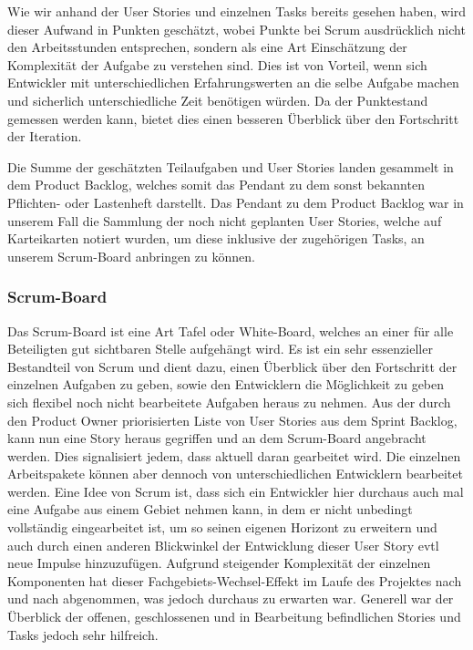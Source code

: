 Wie wir anhand der User Stories und einzelnen Tasks bereits gesehen haben, wird dieser Aufwand in Punkten geschätzt, wobei Punkte bei Scrum ausdrücklich nicht den Arbeitsstunden entsprechen, sondern als eine Art Einschätzung der Komplexität der Aufgabe zu verstehen sind. Dies ist von Vorteil, wenn sich Entwickler mit unterschiedlichen Erfahrungswerten an die selbe Aufgabe machen und sicherlich unterschiedliche Zeit benötigen würden. Da der Punktestand gemessen werden kann, bietet dies einen besseren Überblick über den Fortschritt der Iteration.

Die Summe der geschätzten Teilaufgaben und User Stories landen gesammelt in dem Product Backlog, welches somit das Pendant zu dem sonst bekannten Pflichten- oder Lastenheft darstellt. Das Pendant zu dem Product Backlog war in unserem Fall die Sammlung der noch nicht geplanten User Stories, welche auf Karteikarten notiert wurden, um diese inklusive der zugehörigen Tasks, an unserem Scrum-Board anbringen zu können.


\subsubsection{Scrum-Board}
Das Scrum-Board ist eine Art Tafel oder White-Board, welches an einer für alle Beteiligten gut sichtbaren Stelle aufgehängt wird. Es ist ein sehr essenzieller Bestandteil von Scrum und dient dazu, einen Überblick über den Fortschritt der einzelnen Aufgaben zu geben, sowie den Entwicklern die Möglichkeit zu geben sich flexibel noch nicht bearbeitete Aufgaben heraus zu nehmen.
Aus der durch den Product Owner priorisierten Liste von User Stories aus dem Sprint Backlog, kann nun eine Story heraus gegriffen und an dem Scrum-Board angebracht werden. Dies signalisiert jedem, dass aktuell daran gearbeitet wird. Die einzelnen Arbeitspakete können aber dennoch von unterschiedlichen Entwicklern bearbeitet werden. Eine Idee von Scrum ist, dass sich ein Entwickler hier durchaus auch mal eine Aufgabe aus einem Gebiet nehmen kann, in dem er nicht unbedingt vollständig eingearbeitet ist, um so seinen eigenen Horizont zu erweitern und auch durch einen anderen Blickwinkel der Entwicklung dieser User Story evtl neue Impulse hinzuzufügen.
Aufgrund steigender Komplexität der einzelnen Komponenten hat dieser Fachgebiets-Wechsel-Effekt im Laufe des Projektes nach und nach abgenommen, was jedoch durchaus zu erwarten war.
Generell war der Überblick der offenen, geschlossenen und in Bearbeitung befindlichen Stories und Tasks jedoch sehr hilfreich.


